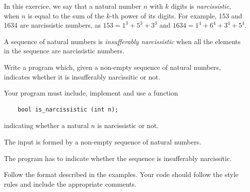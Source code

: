 
\Statement

In this exercice, we say that a natural number $n$ with $k$ digits is  \emph{narcissistic}, when  $n$ is equal to the sum of the $k$-th power of its digits.  For example, 153  and 1634  are narcissistic numbers, as  $153 = 1^3+5^3+3^3$  and  $1634 = 1^4 + 6^4 + 3^4 + 5^4$.

\medskip
A sequence of natural numbers is \emph{insufferably narcissistic} when all the elements in the sequence are narcissistic numbers.

\medskip
Write a program which, given a non-empty sequence of natural numbers, indicates whether it is insufferably narcissitic or not. 
\medskip


Your program must include, implement and use  a function

\begin{lstlisting}
    bool is_narcissistic (int n);
\end{lstlisting}

indicating whether a natural $n$ is  narcissistic or not.

\Input

The input is formed by a non-empty  sequence of natural numbers.

\Output

The program has to indicate whether the sequence is insufferably narcissitic. 

\medskip
Follow the format described in the examples. Your code should follow the style rules and include the appropriate comments.
\Sample
